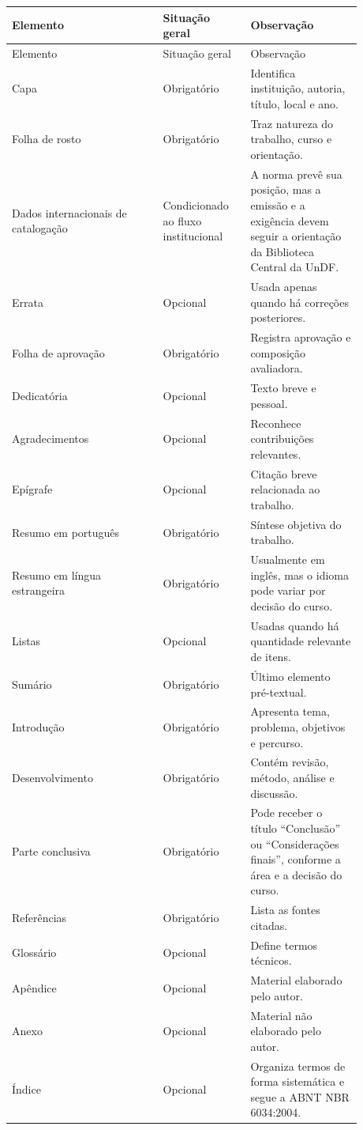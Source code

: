 \begin{longtable}{p{0.38\linewidth}p{0.22\linewidth}p{0.28\linewidth}}
\toprule
Elemento & Situação geral & Observação \\
\midrule
\endfirsthead
\toprule
Elemento & Situação geral & Observação \\
\midrule
\endhead
Capa & Obrigatório & Identifica instituição, autoria, título, local e ano. \\
Folha de rosto & Obrigatório & Traz natureza do trabalho, curso e orientação. \\
Dados internacionais de catalogação & Condicionado ao fluxo institucional & A norma prevê sua posição, mas a emissão e a exigência devem seguir a orientação da Biblioteca Central da UnDF. \\
Errata & Opcional & Usada apenas quando há correções posteriores. \\
Folha de aprovação & Obrigatório & Registra aprovação e composição avaliadora. \\
Dedicatória & Opcional & Texto breve e pessoal. \\
Agradecimentos & Opcional & Reconhece contribuições relevantes. \\
Epígrafe & Opcional & Citação breve relacionada ao trabalho. \\
Resumo em português & Obrigatório & Síntese objetiva do trabalho. \\
Resumo em língua estrangeira & Obrigatório & Usualmente em inglês, mas o idioma pode variar por decisão do curso. \\
Listas & Opcional & Usadas quando há quantidade relevante de itens. \\
Sumário & Obrigatório & Último elemento pré-textual. \\
Introdução & Obrigatório & Apresenta tema, problema, objetivos e percurso. \\
Desenvolvimento & Obrigatório & Contém revisão, método, análise e discussão. \\
Parte conclusiva & Obrigatório & Pode receber o título ``Conclusão'' ou ``Considerações finais'', conforme a área e a decisão do curso. \\
Referências & Obrigatório & Lista as fontes citadas. \\
Glossário & Opcional & Define termos técnicos. \\
Apêndice & Opcional & Material elaborado pelo autor. \\
Anexo & Opcional & Material não elaborado pelo autor. \\
Índice & Opcional & Organiza termos de forma sistemática e segue a ABNT NBR 6034:2004. \\
\bottomrule
\end{longtable}

